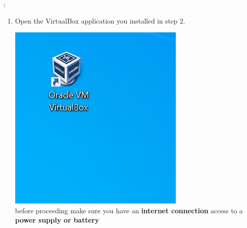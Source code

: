\documentclass[12pt]{article}
\begin{document}
\begin{description}
\begin{description}
\begin{enumerate}[label=\alph*)]
\end{enumerate}
  
  
\newpage  
\item [Part 2 - Virtual Machine Configuration]: \vspace{0mm} \\
\begin{enumerate}[label=\alph*)] 
    	\item Open the VirtualBox application you installed in step 2. \vspace{5mm} \\
    	\begin{multicols}{2}
      	\includegraphics[scale=.55]{Capture2.png}\\
          
                
                before proceeding make sure you have an {\bf \B internet connection } access to a {\bf \R power supply or battery }
         
            \end{multicols}
            \vspace{10mm}
       


\end{enumerate}
\end{description}
\end{description}
\end{document}
